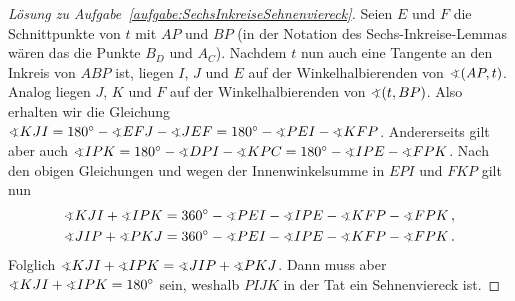 \begin{proof}[Lösung zu Aufgabe~\ref{aufgabe:SechsInkreiseSehnenviereck}]
	Seien $E$ und $F$ die Schnittpunkte von $t$ mit $AP$ und $BP$ (in der Notation des Sechs-Inkreise-Lemmas wären das die Punkte $B_D$ und $A_C$). Nachdem $t$ nun auch eine Tangente an den Inkreis von $ABP$ ist, liegen $I$, $J$ und $E$ auf der Winkelhalbierenden von $\winkel(AP,t)$. Analog liegen $J$, $K$ und $F$ auf der Winkelhalbierenden von $\winkel(t,BP)$. Also erhalten wir die Gleichung $\winkel KJI=180^\circ-\winkel EFJ-\winkel JEF=180^\circ-\winkel PEI-\winkel KFP$. Andererseits gilt aber auch $\winkel IPK=180^\circ-\winkel DPI-\winkel KPC=180^\circ-\winkel IPE-\winkel FPK$. Nach den obigen Gleichungen und wegen der Innenwinkelsumme in $EPI$ und $FKP$ gilt nun
	\begin{align*}
		\winkel KJI+\winkel IPK&=360^\circ-\winkel PEI-\winkel IPE-\winkel KFP-\winkel FPK\,,\\
		\winkel JIP+\winkel PKJ&=360^\circ-\winkel PEI-\winkel IPE-\winkel KFP-\winkel FPK\,.
	\end{align*}
	Folglich $\winkel KJI+\winkel IPK=\winkel JIP+\winkel PKJ$. Dann muss aber $\winkel KJI+\winkel IPK=180^\circ$ sein, weshalb $PIJK$ in der Tat ein Sehnenviereck ist.
\end{proof}

